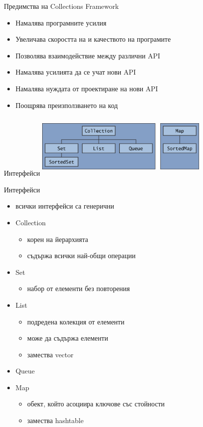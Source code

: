 \documentclass{beamer}
\begin{document}
\begin{frame}{Предимства на Collections Framework}
  \transdissolve
  \begin{itemize}
  \item Намалява програмните усилия
  \item Увеличава скоростта на и качеството на програмите
  \item Позволява взаимодействие между различни API
  \item Намалява усилията да се учат нови API
  \item Намалява нуждата от проектиране на нови API
  \item Поощрява преизползването на код
  \end{itemize}
\end{frame}

\begin{frame}{Интерфейси}
  \transdissolve
  \includegraphics[height=120px,width=320px]{images/colls-coreInterfaces.png}
\end{frame}

\begin{frame}{Интерфейси}
\transdissolve
\begin{itemize}
\item всички интерфейси са генерични
\item Collection
\begin{itemize}
  \item корен на йерархията
  \item съдържа всички най-общи операции
\end{itemize}
\item Set
\begin{itemize}
  \item набор от елементи без повторения
\end{itemize}
\item List
\begin{itemize}
  \item подредена колекция от елементи
  \item може да съдържа елементи
  \item замества vector
\end{itemize}
\item Queue
\item Map 
\begin{itemize}
  \item обект, който асоциира ключове със стойности
  \item замества hashtable
\end{itemize}

\end{itemize}
\end{frame}
\end{document}
